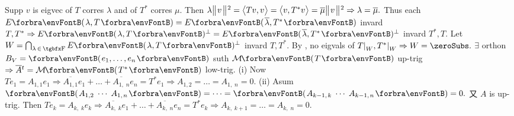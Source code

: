 \pagebreak
{}Supp $v$ is eigvec of $T$ corres $\lambda$ and of $T^*$ corres $\mu.$\parSol{}
Then $\lambda\big\Vert\hspace{1pt}{}v{}\hspace{1pt}\big\Vert{\hspace{0.5pt}}{^2}=\big\langle{}Tv,v{}\big\rangle=\big\langle{}v,T^*v{}\big\rangle=\overline{\mu}\big\Vert\hspace{1pt}{}v{}\hspace{1pt}\big\Vert{\hspace{0.5pt}}{^2}\Rightarrow\lambda=\overline{\mu}.$\parSol{}
Thus each $E\Par{\lambda,T}=E\Par{\overline{\lambda},T^*}$ invard $T,T^*\Rightarrow E\Par{\lambda,T}{^\perp}=E\Par{\overline{\lambda},T^*}{^\perp}$ invard $T^*,T.$\parSol{}
Let $W=\bigcap_{\lambda\,\in\,\Fbb}E\Par{\lambda,T}{^\perp}$ invard $T,T^*.$ By , no eigvals of $T\mmid_W,T^*\mmid_W\Rightarrow W=\zeroSubs.$\PfEnd\vspace{4pt}\parSol{}
\Or $\exists$ orthon $B_V=\Par{e_1,\dots,e_n}$ suth $\Mt{T}$ up-trig $\Rightarrow\overline{A}{^t}=\Mt{T^*}$ low-trig.\parSol{}
(i) Now $Te_1=A_{1,1}e_1\Rightarrow\overline{A_{1,1}}e_1+\dots+\overline{A_{1,\;\!n}}e_n=T^*e_1\Rightarrow A_{1,2}=\dots=A_{1,\;\!n}=0.$\parSol{}
(ii) Asum $\Par{A_{1,2}\;\cdots\;A_{1,\;\!n}}=\dots=\Par{A_{k-1,\;\!k}\;\cdots\;A_{k-1,\;\!n}}=0.$ 又 $A$ is up-trig.\vspace{1pt}\parSol{\Hii}
Then $Te_{k}=A_{k,\;\!k}e_{k}\Rightarrow\overline{A_{k,\;\!k}}e_1+\dots+\overline{A_{k,\;\!n}}e_n=T^*e_{k}\Rightarrow A_{k,\;\!k+1}=\dots=A_{k,\;\!n}=0.$\PfEnd
\SepLine


